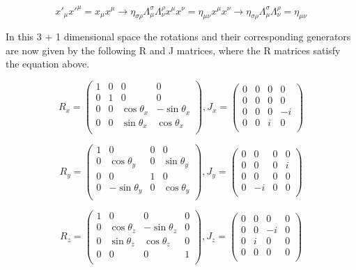 \begin{equation}
x'_{\mu} x'^{\mu} = x_{\mu} x^{\mu} \rightarrow \eta_{\sigma\rho} \Lambda^{\sigma}_{\mu}  \Lambda^{\rho}_{\nu} x^{\mu} x^{\nu} = \eta_{\mu\nu} x^{\mu} x^{\nu}
\rightarrow \eta_{\sigma\rho} \Lambda^{\sigma}_{\mu}  \Lambda^{\rho}_{\nu} = \eta_{\mu\nu}
\end{equation}

In this 3 + 1 dimensional space the rotations and their corresponding generators are now given by the following R and J matrices, where the R matrices satisfy the equation above.

\begin{equation}
R_x = 
\begin{pmatrix}
1 & 0 & 0 & 0\\
0 & 1 & 0 & 0 \\
0 & 0 & \cos\theta_x & -\sin\theta_x \\
0 & 0 & \sin\theta_x & \cos\theta_x \\
\end{pmatrix},
J_x = 
\begin{pmatrix}
0 & 0 & 0 & 0\\
0 & 0 & 0 & 0 \\
0 & 0 & 0 & -i \\
0 & 0 & i & 0 \\
\end{pmatrix}
\end{equation}

\begin{equation}
R_y = 
\begin{pmatrix}
1 & 0 & 0 & 0\\
0 & \cos\theta_y & 0 & \sin\theta_y \\
0 & 0 & 1 & 0 \\
0 & -\sin\theta_y & 0 & \cos\theta_y \\
\end{pmatrix},
J_y = 
\begin{pmatrix}
0 & 0 & 0 & 0\\
0 & 0 & 0 & i \\
0 & 0 & 0 & 0 \\
0 & -i & 0 & 0 \\
\end{pmatrix}
\end{equation}

\begin{equation}
R_z = 
\begin{pmatrix}
1 & 0 & 0 & 0\\
0 & \cos\theta_z & -\sin\theta_z & 0 \\
0 & \sin\theta_z & \cos\theta_z & 0 \\
0 & 0 & 0 & 1 \\
\end{pmatrix},
J_z = 
\begin{pmatrix}
0 & 0 & 0 & 0\\
0 & 0 & -i & 0 \\
0 & i & 0 & 0 \\
0 & 0 & 0 & 0 \\
\end{pmatrix}
\end{equation}


